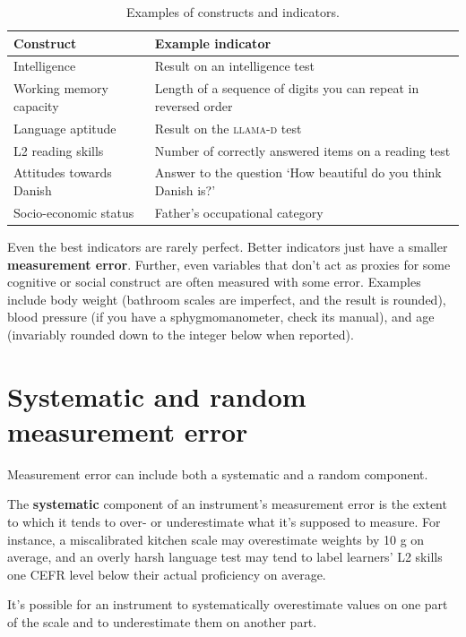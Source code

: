 \documentclass[a4paper]{tufte-book}\usepackage[]{graphicx}\usepackage[]{xcolor}
\newcommand{\term}[1]{\textbf{#1}}
\begin{document}
\begin{table}
\centering
\begin{tabular}{p{4.75cm}p{5cm}}
  \toprule
  Construct                               &   Example indicator \\
  \midrule  
  Intelligence                            &   Result on an intelligence test\\
  Working memory capacity                 &   Length of a sequence of digits you can repeat in reversed order\\
  Language aptitude                       &   Result on the \textsc{llama-d} test\\
  L2 reading skills                       &   Number of correctly answered items on a reading test\\
  Attitudes towards Danish                &   Answer to the question `How beautiful do you think Danish is?'\\
  Socio-economic status                   &   Father's occupational category\\
  \bottomrule
\end{tabular}
\caption{Examples of constructs and indicators.}
\label{tab:constructs}
\end{table}

Even the best indicators are rarely perfect.
Better indicators just have a smaller \term{measurement error}.
Further, even variables that don't act as proxies for some cognitive or social
construct are often measured with some error. Examples include
body weight (bathroom scales are imperfect, and the result is rounded),
blood pressure (if you have a sphygmomanometer,  check its manual),
and age (invariably rounded down to the integer below when reported).

\section{Systematic and random measurement error}
Measurement error can include both a systematic and a random component.

The \term{systematic} component of an instrument's measurement error is the extent
to which it tends to over- or underestimate what it's supposed to measure.
For instance, a miscalibrated kitchen scale may overestimate weights by 10 g on average,
and an overly harsh language test may tend to label learners' L2 skills
one CEFR level below their actual proficiency on average.

It's possible for an instrument to systematically overestimate
values on one part of the scale and to underestimate them on another part.
\end{document}
